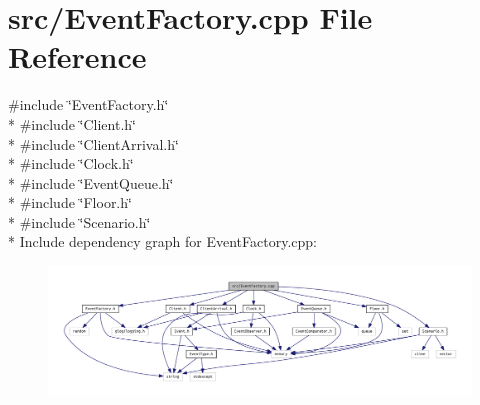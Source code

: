 \section{src/\+Event\+Factory.cpp File Reference}
\label{_event_factory_8cpp}
{\ttfamily \#include \char`\"{}Event\+Factory.\+h\char`\"{}}\\*
{\ttfamily \#include \char`\"{}Client.\+h\char`\"{}}\\*
{\ttfamily \#include \char`\"{}Client\+Arrival.\+h\char`\"{}}\\*
{\ttfamily \#include \char`\"{}Clock.\+h\char`\"{}}\\*
{\ttfamily \#include \char`\"{}Event\+Queue.\+h\char`\"{}}\\*
{\ttfamily \#include \char`\"{}Floor.\+h\char`\"{}}\\*
{\ttfamily \#include \char`\"{}Scenario.\+h\char`\"{}}\\*
Include dependency graph for Event\+Factory.\+cpp\+:\nopagebreak
\begin{figure}[H]
\begin{center}
\leavevmode
\includegraphics[width=350pt]{_event_factory_8cpp__incl}
\end{center}
\end{figure}
